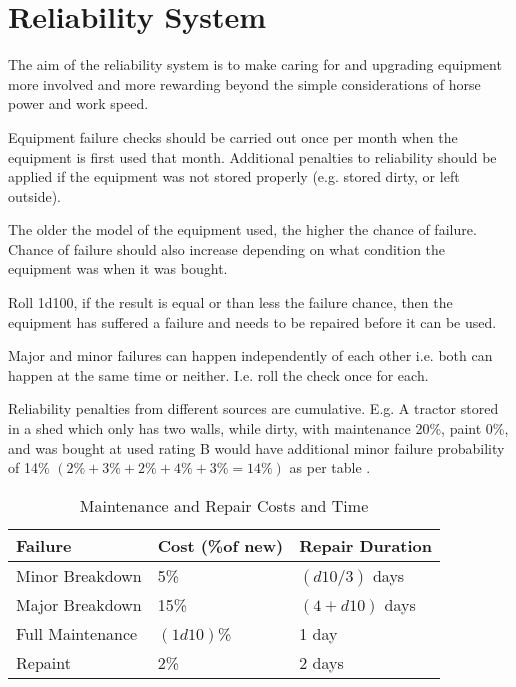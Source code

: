 \documentclass[a4paper,10pt]{article}
\begin{document}
\section{Reliability System}
The aim of the reliability system is to make caring for and upgrading equipment
more involved and more rewarding beyond the simple considerations of horse power
and work speed.

Equipment failure checks should be carried out once per month when the equipment
is first used that month. Additional penalties to reliability should be applied
if the equipment was not stored properly (e.g. stored dirty, or left outside).

The older the model of the equipment used, the higher the chance of failure.
Chance of failure should also increase depending on what condition the equipment
was when it was bought.

Roll 1d100, if the result is equal or than less the failure chance, then the
equipment has suffered a failure and needs to be repaired before it can be used.

Major and minor failures can happen independently of each other i.e. both can
happen at the same time or neither. I.e. roll the check once for each.

Reliability penalties from different sources are cumulative. E.g. A tractor
stored in a shed which only has two walls, while dirty, with maintenance 20\%,
paint 0\%, and was bought at used rating B would have additional minor failure
probability of 14\% $(2\% + 3\% + 2\% + 4\% + 3\% = 14\%)$ as per table
.


\begin{table}
  \caption{Maintenance and Repair Costs and Time}
  \begin{tabular}{lll}
    \toprule
    Failure          & Cost (\%of new) & Repair Duration  \\
    \midrule
    Minor Breakdown  & 5\%             & $(d10 / 3)$ days\\
    Major Breakdown  & 15\%            & $(4 + d10)$ days \\
    Full Maintenance & $(1d10)$\%      & 1 day\\
    Repaint          & 2\%             & 2 days\\
    \bottomrule
  \end{tabular}
\end{table}
\end{document}
